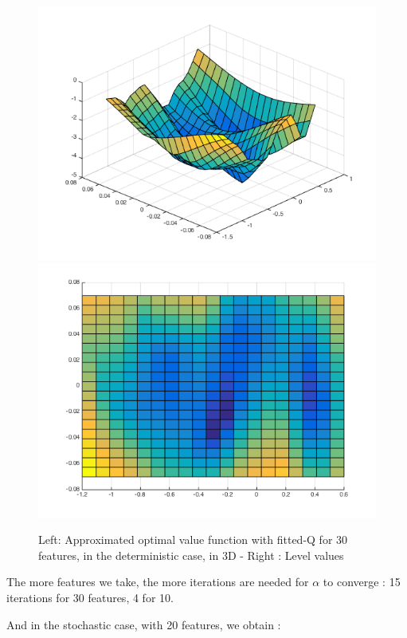 \documentclass[a4paper, 12pt]{article}
\begin{document}
\begin{figure}[H]
	\centering
	\noindent\includegraphics[scale=0.3]{fittedQ-30feat-determ.png}
	\noindent\includegraphics[scale=0.3]{fittedQ-30feat-determ-flat.png}
	\caption{Left: Approximated optimal value function with fitted-Q for 30 features, in the deterministic case, in 3D - Right : Level values}
\end{figure}
The more features we take, the more iterations are needed for $\alpha$ to converge : 15 iterations for 30 features, 4 for 10.

And in the stochastic case, with 20 features, we obtain :
\end{document}
